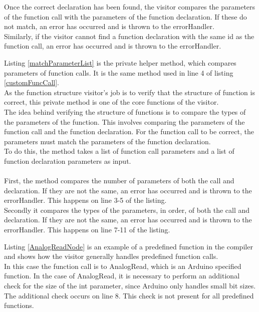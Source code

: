 Once the correct declaration has been found, the visitor compares the parameters of the function call with the parameters of the function declaration. If these do not match, an error has occurred and is thrown to the errorHandler.\\
Similarly, if the visitor cannot find a function declaration with the same id as the function call, an error has occurred and is thrown to the errorHandler.

\noindent\newline
Listing \ref{matchParameterList} is the private helper method, which compares parameters of function calls. It is the same method used in line 4 of listing \ref{customFuncCall}.\\
As the function structure visitor’s job is to verify that the structure of function is correct, this private method is one of the core functions of the visitor.\\
The idea behind verifying the structure of functions is to compare the types of the parameters of the function. This involves comparing the parameters of the function call and the function declaration. For the function call to be correct, the parameters must match the parameters of the function declaration.\\
To do this, the method takes a list of function call parameters and a list of function declaration parameters as input.
\\\\
First, the method compares the number of parameters of both the call and declaration. If they are not the same, an error has occurred and is thrown to the errorHandler. This happens on line 3-5 of the listing.\\
Secondly it compares the types of the parameters, in order, of both the call and declaration. If they are not the same, an error has occurred and is thrown to the errorHandler. This happens on line 7-11 of the listing.

\noindent\newline
Listing \ref{AnalogReadNode} is an example of a predefined function in the compiler and shows how the visitor generally handles predefined function calls.\\
In this case the function call is to AnalogRead, which is an Arduino specified function. In the case of AnalogRead, it is necessary to perform an additional check for the size of the int parameter, since Arduino only handles small bit sizes. The additional check occurs on line 8. This check is not present for all predefined functions.
